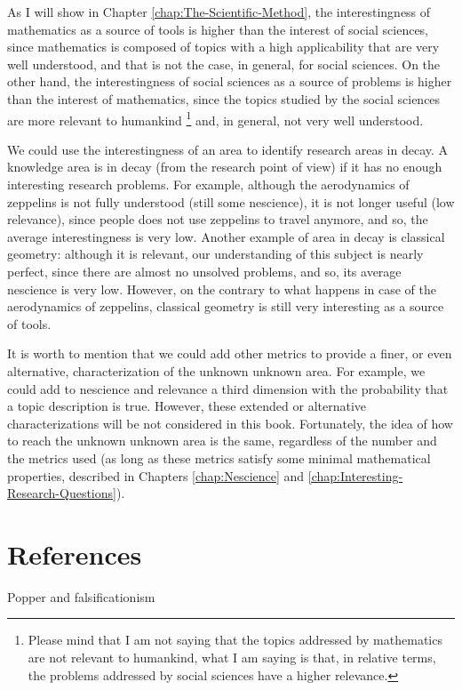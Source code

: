 As I will show in Chapter \ref{chap:The-Scientific-Method}, the interestingness of mathematics as a source of tools is higher than the interest of social sciences, since mathematics is composed of topics with a high applicability that are very well understood, and that is not the case, in general, for social sciences. On the other hand, the interestingness of social sciences as a source of problems is higher than the interest of mathematics, since the topics studied by the social sciences are more relevant to humankind \footnote{Please mind that I am not saying that the topics addressed by mathematics are not relevant to humankind, what I am saying is that, in relative terms, the problems addressed by social sciences have a higher relevance.} and, in general, not very well understood.

\begin{example}
We could use the interestingness of an area to identify research areas in decay. A knowledge area is in decay (from the research point of view) if it has no enough interesting research problems. For example, although the aerodynamics of zeppelins is not fully understood (still some nescience), it is not longer useful (low relevance), since people does not use zeppelins to travel anymore, and so, the average interestingness is very low. Another example of area in decay is classical geometry: although it is relevant, our understanding of this subject is nearly perfect, since there are almost no unsolved problems, and so, its average nescience is very low. However, on the contrary to what happens in case of the aerodynamics of zeppelins, classical geometry is still very interesting as a source of tools.
\end{example}

It is worth to mention that we could add other metrics to provide a finer, or even alternative, characterization of the unknown unknown area. For example, we could add to nescience and relevance a third dimension with the probability that a topic description is true. However, these extended or alternative characterizations will be not considered in this book. Fortunately, the idea of how to reach the unknown unknown area is the same, regardless of the number and the metrics used (as long as these metrics satisfy some minimal mathematical properties, described in Chapters \ref{chap:Nescience} and \ref{chap:Interesting-Research-Questions}).

%
%

\section*{References}

Popper and falsificationism

